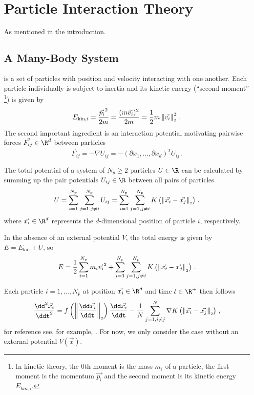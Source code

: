 \chapter{Particle Interaction Theory}
\label{chap:particle-interaction-theory}

As mentioned in the introduction.

\section{A Many-Body System}
is a set of particles with position and velocity interacting with one another.
Each particle individually is subject to inertia and its kinetic energy (``second moment'' \footnote{
  In kinetic theory, the $0$th moment is the mass $m_i$ of a particle, the first moment is the momentum $\vec{p_i}$ and the second moment is its kinetic energy $E_{kin,i}$.
}) is given by
$$E_{\text{kin},i} = \frac{\vec{p_i}^2}{2m} = \frac{(m \vec{v_i})^2}{2m} = \frac{1}{2} m \left\lVert\vec{v_i}\right\rVert_{\scriptscriptstyle 2}^2\,.$$
The second important ingredient is an interaction potential motivating pairwise forces $\vec{F_{ij}} \in \R^d$ between particles
$$\vec{F}_{ij} = -\nabla U_{ij} = -\left(\partial x_1, ..., \partial x_d\right)^T U_{ij}\,.$$

The total potential of a system of $N_p \ge 2$ particles $U \in \R$ can be calculated by summing up the pair potentials $U_{ij} \in \R$ between all pairs of particles
$$U = \sum_{i=1}^{N_p}\sum_{j=1, j \neq i}^{N_p} U_{ij} = \sum_{i=1}^{N_p}\sum_{j=1, j \neq i}^{N_p} K\left(\left\lVert\vec{x_i} - \vec{x_j}\right\rVert_{\scriptscriptstyle 2}\right)\,,$$
where $\vec{x_i} \in \R^d$ represents the $d$-dimensional position of particle $i$, respectively.

In the absence of an external potential $V$, the total energy is given by $E = E_{\text{kin}} + U$, so
\begin{equation}
  E = \frac{1}{2} \sum_{i=1}^{N_p} m_i \vec{v_i}^2 + \sum_{i=1}^{N_p}\sum_{j=1, j \neq i}^{N_p} K\left(\left\lVert\vec{x_i} - \vec{x_j}\right\rVert_{\scriptscriptstyle 2}\right)\,.
  \label{eq:total-energy}
\end{equation}

Each particle $i=1, ..., N_p$ at position $\vec{x_i} \in \R^d$ and time $t \in \R^+$ then follows
\begin{equation}
  \frac{\dd^2 \vec{x_i}}{\ddt^2} = f\left(\norm{\frac{\dd \vec{x_i}}{\ddt}}\right) \frac{\dd\vec{x_i}}{\ddt} - \frac{1}{N} \sum_{j=1, i\neq j}^{N} \nabla K\left(\norm{\vec{x_i} - \vec{x_j}}\right)\,,
  \label{eq:evolution-equation}
\end{equation}
for reference see, for example, \parencite{2020-power-law-kernels, 2021-arbitrary-dimensions}.
For now, we only consider the case without an external potential $V(\vec{x})$.

